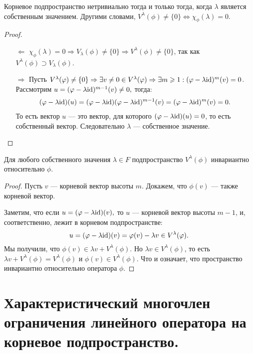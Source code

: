 \begin{Suggestion}
	Корневое подпространство нетривиально тогда и только тогда, когда $\lambda$ является собственным значением. Другими словами, $V^{\lambda}(\phi) \neq \{0\} 	
	\Leftrightarrow \chi_{\phi}(\lambda) = 0.$
\end{Suggestion}
\begin{proof}\
	\begin{itemize}
		\item[$\Leftarrow$]
		$\chi_{\phi}(\lambda) = 0 \Rightarrow V_{\lambda}(\phi) \neq \{0\} \Rightarrow V^{\lambda}(\phi) \neq \{0\}$, так как $V^{\lambda}(\phi) \supset V_{\lambda}(\phi)$.
		\item[$\Rightarrow$]
		Пусть $V^{\lambda}(\varphi) \neq \{0\} \Rightarrow \exists v \neq 0 \in V^{\lambda}(\varphi) \Rightarrow \exists m \geqslant 1: (\varphi - \lambda \mathrm{id})^{m}(v) = 0$. \\
		Рассмотрим $u = (\varphi - \lambda \mathrm{id})^{m - 1}(v) \neq 0,$ тогда:
		\begin{gather*}
		(\varphi - \lambda \mathrm{id})(u) = (\varphi - \lambda \mathrm{id})(\varphi - \lambda \mathrm{id})^{m - 1}(v) = (\varphi - \lambda \mathrm{id})^{m}(v) = 0.
		\end{gather*}
		То есть вектор $u$ --- это вектор, для которого $(\varphi - \lambda \mathrm{id})(u) = 0$, то есть собственный вектор. Следовательно $\lambda$ --- собственное значение.
	\end{itemize}
\end{proof}
\begin{Suggestion}
	Для любого собственного значения $\lambda \in F$ подпространство $V^{\lambda}(\phi)$ инвариантно относительно $\phi$.
\end{Suggestion}
\begin{proof}
	Пусть $v$ --- корневой вектор высоты $m$. Докажем, что $\phi(v)$ --- также корневой вектор. 
	
	Заметим, что если $u = (\varphi - \lambda \mathrm{id})(v),$ то $u$ --- корневой вектор высоты $m - 1$, и, соответственно, лежит в корневом подпространстве:
	$$
	u = (\varphi - \lambda \mathrm{id})(v) = \varphi(v) - \lambda{v} \in V^{\lambda}(\varphi).
	$$
	Мы получили, что 
	$\phi(v) \in \lambda{v} + V^{\lambda}(\phi).$ 
	Но $\lambda{v} \in V^{\lambda}(\phi)$, то есть $\lambda{v} + V^{\lambda}(\phi) = V^{\lambda}(\phi)$ и $\phi(v) \in V^{\lambda}(\phi)$. Что и означает, что пространство инвариантно относительно оператора $\phi$.
\end{proof}

\section{Характеристический многочлен ограничения линейного оператора на корневое подпространство.}

